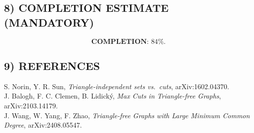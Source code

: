 \subsection*{8) COMPLETION ESTIMATE (MANDATORY)}
\[
\textbf{COMPLETION: }84\%.
\]

\subsection*{9) REFERENCES}
S. Norin, Y. R. Sun, \emph{Triangle-independent sets vs.\ cuts}, arXiv:1602.04370.\\
J. Balogh, F. C. Clemen, B. Lidick\'y, \emph{Max Cuts in Triangle-free Graphs}, arXiv:2103.14179.\\
J. Wang, W. Yang, F. Zhao, \emph{Triangle-free Graphs with Large Minimum Common Degree}, arXiv:2408.05547.

